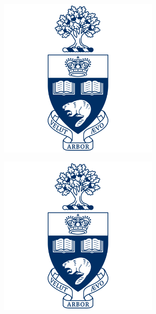 \documentclass[landscape,a0b,final,a4resizeable]{include/a0poster}
\begin{document}
\begin{poster}
\begin{multicols}{3}
		

\vspace{1.cm}

 \begin{center}
\begin{minipage}[c]{0.2\columnwidth}
  \includegraphics[width=8cm]{badges/toronto}
  \captionsetup{labelformat=empty}
\end{minipage}
\begin{minipage}[c]{0.2\columnwidth}
  \includegraphics[width=8cm]{badges/toronto}

\end{minipage}
\end{center}
\end{multicols}
\end{poster}
\end{document}
